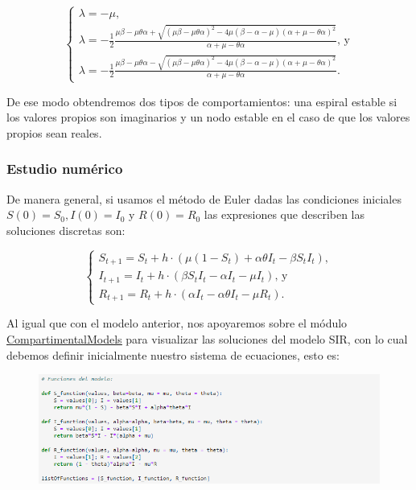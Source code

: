$$\left\{\begin{array}{l}
\lambda=-\mu,\\
\lambda=-\frac{1}{2}\frac{\mu\beta-\mu\theta\alpha+\sqrt{(\mu\beta-\mu\theta\alpha)^2-4\mu(\beta-\alpha-\mu)(\alpha+\mu-\theta\alpha)^2}}{\alpha+\mu-\theta\alpha} \text{, y}\\
\lambda=-\frac{1}{2}\frac{\mu\beta-\mu\theta\alpha-\sqrt{(\mu\beta-\mu\theta\alpha)^2-4\mu(\beta-\alpha-\mu)(\alpha+\mu-\theta\alpha)^2}}{\alpha+\mu-\theta\alpha}.
\end{array}\right.$$

De ese modo obtendremos dos tipos de comportamientos: una espiral estable si los valores propios son imaginarios y un nodo estable en el caso de que los valores propios sean reales.

\subsubsection{Estudio numérico}

De manera general, si usamos el método de Euler dadas las condiciones iniciales $S(0)=S_0,I(0)=I_0$ y $R(0)=R_0$ las expresiones que describen las soluciones discretas son:

$$\left\{\begin{array}{l}
S_{t+1} = S_t + h\cdot(\mu(1 - S_t) + \alpha\theta I_t - \beta S_t I_t), \\
I_{t+1} = I_t + h\cdot(\beta S_t I_t - \alpha I_t - \mu I_t)\text{, y} \\
R_{t+1} = R_t + h\cdot(\alpha I_t - \alpha\theta I_t - \mu R_t).
\end{array}\right.$$

Al igual que con el modelo anterior, nos apoyaremos sobre el módulo \href{https://github.com/Grupo-de-simulacion-con-automatas/Prediccion-del-comportamiento-de-una-enfermedad-simulada-en-AC-con-un-algoritmo-en-RN/blob/master/Codigo/1.\%20Modelos\%20compartimentales\%20en\%20ecuaciones\%20diferenciales.ipynb}{\underline{CompartimentalModels}} para visualizar las soluciones del modelo SIR, con lo cual debemos definir inicialmente nuestro sistema de ecuaciones, esto es:

\begin{figure}[h]
  \centering
    \includegraphics[width=1\textwidth]{Imagenes/compartimentalModels3.png}
\end{figure}

